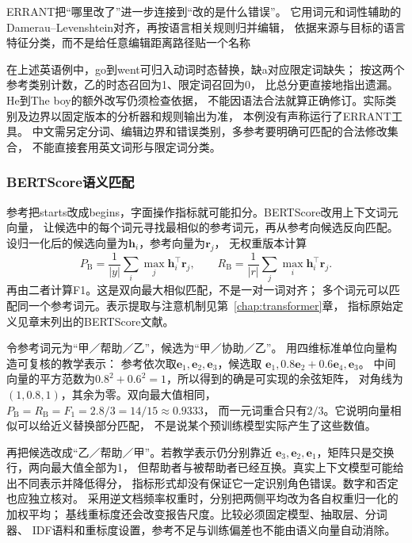 ERRANT把“哪里改了”进一步连接到“改的是什么错误”。
它用词元和词性辅助的Damerau--Levenshtein对齐，再按语言相关规则归并编辑，
依据来源与目标的语言特征分类，而不是给任意编辑距离路径贴一个名称

在上述英语例中，go到went可归入动词时态替换，缺a对应限定词缺失；
按这两个参考类别计数，乙的时态召回为1、限定词召回为0，
比总分更直接地指出遗漏。He到The boy的额外改写仍须检查依据，
不能因语法合法就算正确修订。实际类别及边界以固定版本的分析器和规则输出为准，
本例没有声称运行了ERRANT工具。
中文需另定分词、编辑边界和错误类别，多参考要明确可匹配的合法修改集合，
不能直接套用英文词形与限定词分类。

\subsubsection{BERTScore语义匹配}
\label{sec:nlp-generation-bertscore}

参考把starts改成begins，字面操作指标就可能扣分。BERTScore改用上下文词元向量，
让候选中的每个词元寻找最相似的参考词元，再从参考向候选反向匹配。
设归一化后的候选向量为$\bm h_i$，参考向量为$\bm r_j$，
无权重版本计算
\begin{equation}
  P_{\mathrm{B}}=\frac{1}{|y|}\sum_i\max_j\bm h_i^\top\bm r_j,\qquad
  R_{\mathrm{B}}=\frac{1}{|r|}\sum_j\max_i\bm h_i^\top\bm r_j.
  \label{eq:nlp-generation-bertscore}
\end{equation}
再由二者计算F1。这是双向最大相似匹配，不是一对一词对齐；
多个词元可以匹配同一个参考词元。表示提取与注意机制见第~\ref{chap:transformer}章，
指标原始定义见章末列出的BERTScore文献。

令参考词元为“甲／帮助／乙”，候选为“甲／协助／乙”。
用四维标准单位向量构造可复核的教学表示：
参考依次取$\bm e_1,\bm e_2,\bm e_3$，候选取
$\bm e_1,0.8\bm e_2+0.6\bm e_4,\bm e_3$。
中间向量的平方范数为$0.8^2+0.6^2=1$，所以得到的确是可实现的余弦矩阵，
对角线为$(1,0.8,1)$，其余为零。双向最大值相同，
$P_{\mathrm B}=R_{\mathrm B}=F_1=2.8/3=14/15\approx0.9333$，
而一元词重合只有$2/3$。它说明向量相似可以给近义替换部分匹配，
不是说某个预训练模型实际产生了这些数值。

再把候选改成“乙／帮助／甲”。若教学表示仍分别靠近
$\bm e_3,\bm e_2,\bm e_1$，矩阵只是交换行，两向最大值全部为1，
但帮助者与被帮助者已经互换。真实上下文模型可能给出不同表示并降低得分，
指标形式却没有保证它一定识别角色错误。数字和否定也应独立核对。
采用逆文档频率权重时，分别把两侧平均改为各自权重归一化的加权平均；
基线重标度还会改变报告尺度。比较必须固定模型、抽取层、分词器、
IDF语料和重标度设置，参考不足与训练偏差也不能由语义向量自动消除。

